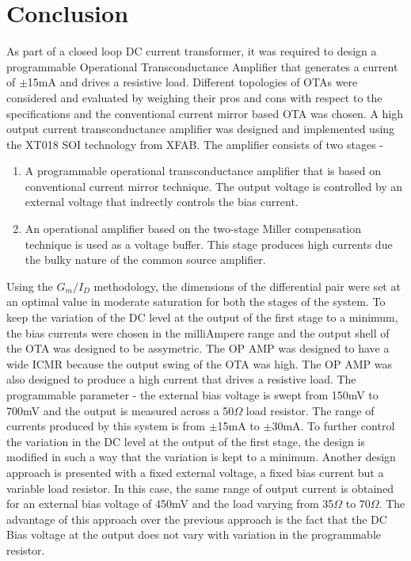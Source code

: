 \chapter{Conclusion}
As part of a closed loop DC current transformer, it was required to design a programmable Operational Transconductance Amplifier that generates a current of $\pm$15mA and drives a resistive load. Different topologies of OTAs were considered and evaluated by weighing their pros and cons with respect to the specifications and the conventional current mirror based OTA was chosen. A high output current transconductance amplifier was designed and implemented using the XT018 SOI technology from XFAB. The amplifier consists of two stages - 
\begin{enumerate}
\item A programmable operational transconductance amplifier that is based on conventional current mirror technique. The output voltage is controlled by an external voltage that indrectly controls the bias current.
\item An operational amplifier based on the two-stage Miller compensation technique is used as a voltage buffer. This stage produces high currents due the bulky nature of the common source amplifier.
\end{enumerate}
Using the $G_m/I_D$ methodology, the dimensions of the differential pair were set at an optimal value in moderate saturation for both the stages of the system. To keep the variation of the DC level at the output of the first stage to a minimum, the bias currents were chosen in the milliAmpere range and the output shell of the OTA was designed to be assymetric. The OP AMP was designed to have a wide ICMR because the output swing of the OTA was high. The OP AMP was also designed to produce a high current that drives a resistive load. The programmable parameter - the external bias voltage is swept from 150mV to 700mV and the output is measured across a 50$\Omega$ load resistor. The range of currents produced by this system is from $\pm$15mA to $\pm$30mA. To further control the variation in the DC level at the output of the first stage, the design is modified in such a way that the variation is kept to a minimum. Another design approach is presented with a fixed external voltage, a fixed bias current but a variable load resistor. In this case, the same range of output current is obtained for an external bias voltage of 450mV and the load varying from 35$\Omega$ to 70$\Omega$. The advantage of this approach over the previous approach is the fact that the DC Bias voltage at the output does not vary with variation in the programmable resistor.
\vfill
\clearpage

